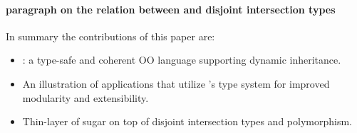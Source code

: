 \paragraph{paragraph on the relation between \name and disjoint
  intersection types}

In summary the contributions of this paper are:

\begin{itemize}

\item \name: a type-safe and coherent OO language supporting dynamic
inheritance.

\item An illustration of applications that utilize \name's type system 
for improved modularity and extensibility.

\item Thin-layer of sugar on top of disjoint intersection types and
  polymorphism.

\end{itemize}

\begin{comment}

\paragraph{\bf JavaScript-style Mixin-Based Programming}
A common programming pattern in JavaScript is based on a variant of
Mixins. This programming style is very flexible and enables forms 
of reuse not usually available in more statically typed languages like Java.
However, mixins in JavaScript fundamentally rely on an \emph{object-level composition}
operator for inheritance~\cite{}. This requires a very dynamic form of
inheritance/delegation that is not available in most class-based 
statically-typed OO languages. Ideally the essence of such 
form of mixins should be capturable in statically-typed languages. 
Languages such as TypeScript do attempt to provide better static
type-checking support for those patterns. However, as recently illustrated 
by the work of \citet{alpuimdisjoint}, there are several issues with such an
approach, including type-unsoundness!

\end{comment}